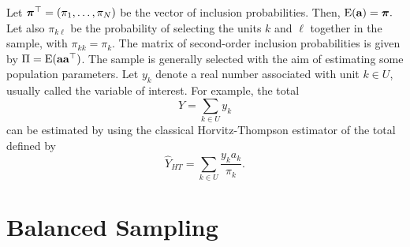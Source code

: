 \documentclass[12pt,english]{article}\usepackage[]{graphicx}\usepackage{xcolor}
\begin{document}
Let $\boldsymbol{\pi}^\top=(\pi_1,\dots,\pi_N)$ be the vector of inclusion probabilities. Then, $\textrm{E}({\textbf{a}})=\boldsymbol{\pi}.$ Let also $\pi_{k\ell}$ be the probability of selecting the units $k$ and $\ell$ together in the sample, with $\pi_{kk} = \pi_k$. The matrix of second-order inclusion probabilities is given by $\Pi = {\rm E}(\textbf{a}\textbf{a}^\top)$. The sample is generally selected with the aim of estimating some population parameters. Let $y_k$ denote a real number associated with unit $k\in U$, usually called the variable of interest. For example, the total
$$
Y=\sum_{k\in U} y_k
$$
can be estimated by using the classical Horvitz-Thompson estimator of the total defined by
\begin{equation}\label{eq:HT}
\widehat{Y}_{HT} = \sum_{k\in U} \frac{y_k a_k}{\pi_k}.
\end{equation}




\section{Balanced Sampling}
\end{document}
